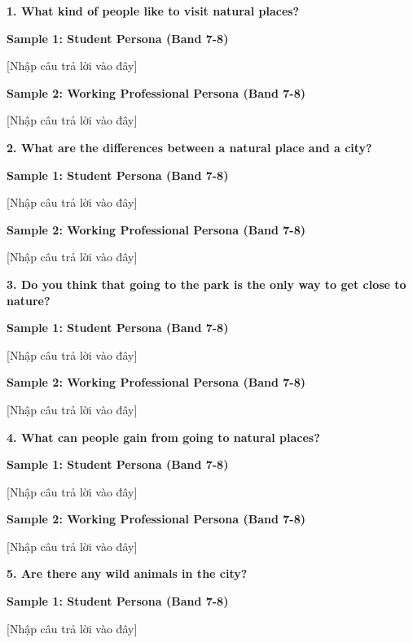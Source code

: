 \partthreeheader

\begin{ieltsquestion}
\textbf{1. What kind of people like to visit natural places?}
\end{ieltsquestion}
\textbf{Sample 1: Student Persona (Band 7-8)}

[Nhập câu trả lời vào đây]

\textbf{Sample 2: Working Professional Persona (Band 7-8)}

[Nhập câu trả lời vào đây]

\separator

\begin{ieltsquestion}
\textbf{2. What are the differences between a natural place and a city?}
\end{ieltsquestion}
\textbf{Sample 1: Student Persona (Band 7-8)}

[Nhập câu trả lời vào đây]

\textbf{Sample 2: Working Professional Persona (Band 7-8)}

[Nhập câu trả lời vào đây]

\separator

\begin{ieltsquestion}
\textbf{3. Do you think that going to the park is the only way to get close to nature?}
\end{ieltsquestion}
\textbf{Sample 1: Student Persona (Band 7-8)}

[Nhập câu trả lời vào đây]

\textbf{Sample 2: Working Professional Persona (Band 7-8)}

[Nhập câu trả lời vào đây]

\separator

\begin{ieltsquestion}
\textbf{4. What can people gain from going to natural places?}
\end{ieltsquestion}
\textbf{Sample 1: Student Persona (Band 7-8)}

[Nhập câu trả lời vào đây]

\textbf{Sample 2: Working Professional Persona (Band 7-8)}

[Nhập câu trả lời vào đây]

\separator

\begin{ieltsquestion}
\textbf{5. Are there any wild animals in the city?}
\end{ieltsquestion}
\textbf{Sample 1: Student Persona (Band 7-8)}

[Nhập câu trả lời vào đây]

